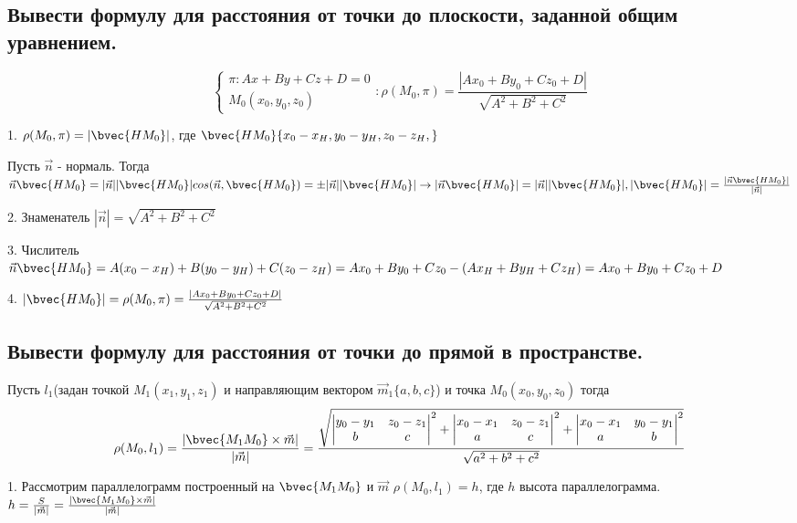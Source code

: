 \subsection{Вывести формулу для расстояния от точки до плоскости, заданной общим уравнением. }

$$\begin{cases}\pi:Ax + By + Cz + D =0\\M_0(x_0, y_0, z_0)\end{cases}:
    \rho (M_0, \pi) = \frac{ |Ax_0 + By_0 + Cz_0 + D| }{\sqrt{A^2+B^2+C^2}}$$

1. $\rho(M_0, \pi) = |\bvec{HM_0}|$, где $\bvec{HM_0}\{x_0-x_H,y_0-y_H,z_0-z_H,\}$

Пусть $\vec{n}$ - нормаль. Тогда $\vec{n}\bvec{HM_0} = |\vec{n}||\bvec{HM_0}|cos(\vec{n}, 
\bvec{HM_0}) = \pm|\vec{n}||\bvec{HM_0}| \rightarrow |\vec{n}\bvec{HM_0}| = 
|\vec{n}||\bvec{HM_0}|, |\bvec{HM_0}| = \frac{ |\vec{n}\bvec{HM_0}| }{ |\vec{n}| }$

2. Знаменатель $|\vec{n}| = \sqrt{A^2+B^2+C^2}$

3. Числитель $\vec{n}\bvec{HM_0} = A(x_0-x_H)+B(y_0-y_H)+C(z_0-z_H) = Ax_0 + By_0 
+ Cz_0 - (Ax_H + By_H + Cz_H) = Ax_0 + By_0 + Cz_0 + D$

4. $|\bvec{HM_0}| = \rho (M_0, \pi) = \frac{ |Ax_0 + By_0 + Cz_0 + D| }{\sqrt{A^2+B^2+C^2}}$

\subsection{Вывести формулу для расстояния от точки до прямой в пространстве.}

Пусть $l_1$(задан точкой $M_1(x_1, y_1, z_1)$ и направляющим вектором $\vec{m}_1\{a,b,c\}$) и точка 
$M_0(x_0,y_0,z_0)$ тогда 
$$\rho(M_0, l_1) = \frac{ |\bvec{M_1M_0}\times\vec{m}| }{ |\vec{m}| } = 
\frac{\sqrt{\begin{vmatrix}y_0-y_1&z_0-z_1\\b&c\end{vmatrix}^2+
\begin{vmatrix}x_0-x_1&z_0-z_1\\a&c\end{vmatrix}^2+
\begin{vmatrix}x_0-x_1&y_0-y_1\\a&b\end{vmatrix}^2}}{\sqrt{a^2+b^2+c^2}}$$

1. Рассмотрим параллелограмм построенный на  $\bvec{M_1M_0}$ и $\vec{m}$
$\rho(M_0, l_1) = h$, где $h$ высота параллелограмма.
$h = \frac{S}{ |\vec{m}| } = \frac{ |\bvec{M_1M_0} \times \vec{m}| }{ |\vec{m}| }$

